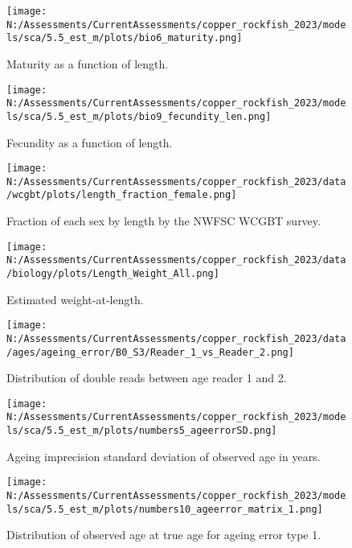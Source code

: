 \documentclass[11pt,
  english,
  letterpaper,
]{article}
\begin{document}
\begin{figure}
\centering
\texttt{[image: N:/Assessments/CurrentAssessments/copper\_rockfish\_2023/models/sca/5.5\_est\_m/plots/bio6\_maturity.png]}
\caption{Maturity as a function of length.\label{fig:maturity}}
\end{figure}

\begin{figure}
\centering
\texttt{[image: N:/Assessments/CurrentAssessments/copper\_rockfish\_2023/models/sca/5.5\_est\_m/plots/bio9\_fecundity\_len.png]}
\caption{Fecundity as a function of length.\label{fig:fecundity}}
\end{figure}

\begin{figure}
\centering
\texttt{[image: N:/Assessments/CurrentAssessments/copper\_rockfish\_2023/data/wcgbt/plots/length\_fraction\_female.png]}
\caption{Fraction of each sex by length by the NWFSC WCGBT survey.\label{fig:frac-sex-len}}
\end{figure}

\begin{figure}
\centering
\texttt{[image: N:/Assessments/CurrentAssessments/copper\_rockfish\_2023/data/biology/plots/Length\_Weight\_All.png]}
\caption{Estimated weight-at-length.\label{fig:weight-length}}
\end{figure}

\begin{figure}
\centering
\texttt{[image: N:/Assessments/CurrentAssessments/copper\_rockfish\_2023/data/ages/ageing\_error/B0\_S3/Reader\_1\_vs\_Reader\_2.png]}
\caption{Distribution of double reads between age reader 1 and 2.\label{fig:age-error-dist}}
\end{figure}

\begin{figure}
\centering
\texttt{[image: N:/Assessments/CurrentAssessments/copper\_rockfish\_2023/models/sca/5.5\_est\_m/plots/numbers5\_ageerrorSD.png]}
\caption{Ageing imprecision standard deviation of observed age in years.\label{fig:age-error}}
\end{figure}

\begin{figure}
\centering
\texttt{[image: N:/Assessments/CurrentAssessments/copper\_rockfish\_2023/models/sca/5.5\_est\_m/plots/numbers10\_ageerror\_matrix\_1.png]}
\caption{Distribution of observed age at true age for ageing error type 1.\label{fig:age-error-matrix}}
\end{figure}
\end{document}
